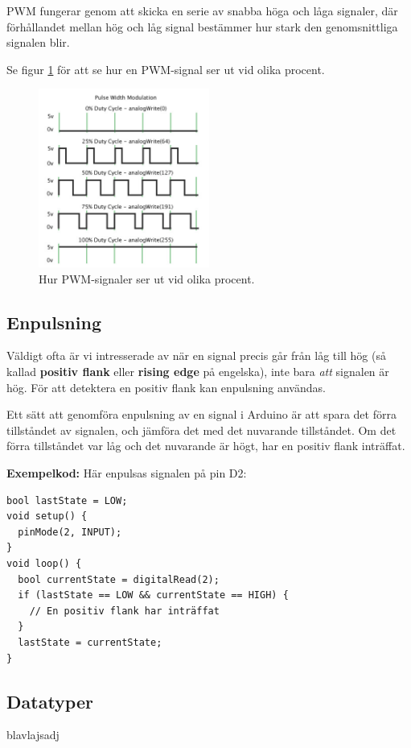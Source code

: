 \documentclass[11pt]{article}
\begin{document}
PWM fungerar genom att skicka en serie av snabba höga och låga signaler, där
förhållandet mellan hög och låg signal bestämmer hur stark den genomsnittliga
signalen blir.

Se figur \ref{fig:pwm} för att se hur en PWM-signal ser ut vid olika procent.
\begin{figure}[H]
  \centering
  \includegraphics[width=0.5\textwidth]{pwm}
  \caption{Hur PWM-signaler ser ut vid olika procent.}
  \label{fig:pwm}
\end{figure}

\subsection{Enpulsning}\label{sec:enpulsning}
Väldigt ofta är vi intresserade av när en signal precis går från låg till hög
(så kallad \textbf{positiv flank} eller \textbf{rising edge} på engelska), inte
bara \textit{att} signalen är hög. För att detektera en positiv flank kan
enpulsning användas.

Ett sätt att genomföra enpulsning av en signal i Arduino är att spara det förra
tillståndet av signalen, och jämföra det med det nuvarande tillståndet. Om det
förra tillståndet var låg och det nuvarande är högt, har en positiv flank
inträffat.

\textbf{Exempelkod:}
Här enpulsas signalen på pin D2:
\begin{lstlisting}
bool lastState = LOW;
void setup() {
  pinMode(2, INPUT);
}
void loop() {
  bool currentState = digitalRead(2);
  if (lastState == LOW && currentState == HIGH) {
    // En positiv flank har inträffat
  }
  lastState = currentState;
}
\end{lstlisting}

\subsection{Datatyper}
blavlajsadj
\end{document}

